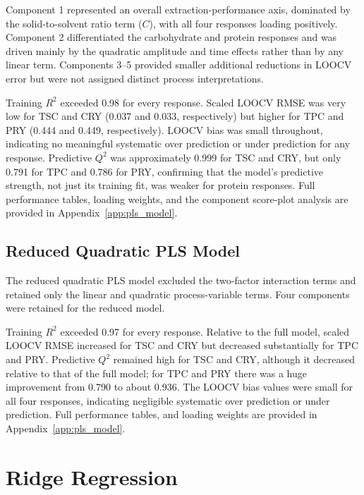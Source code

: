 \documentclass[MScDSA]{uccthesis}
\begin{document}
Component 1 represented an overall extraction-performance axis, dominated by the solid-to-solvent ratio term ($C$), with all four responses loading positively. Component 2 differentiated the carbohydrate and protein responses and was driven mainly by the quadratic amplitude and time effects rather than by any linear term. Components 3--5 provided smaller additional reductions in LOOCV error but were not assigned distinct process interpretations.

Training $R^2$ exceeded 0.98 for every response. Scaled LOOCV RMSE was very low for TSC and CRY (0.037 and 0.033, respectively) but higher for TPC and PRY (0.444 and 0.449, respectively). LOOCV bias was small throughout, indicating no meaningful systematic over prediction or under prediction for any response. Predictive $Q^2$ was approximately 0.999 for TSC and CRY, but only 0.791 for TPC and 0.786 for PRY, confirming that the model's predictive strength, not just its training fit, was weaker for protein responses. Full performance tables, loading weights, and the component score-plot analysis are provided in Appendix~\ref{app:pls_model}.

\subsection{Reduced Quadratic PLS Model}
\label{sec:red_quad_pls}
The reduced quadratic PLS model excluded the two-factor interaction terms and retained only the linear and quadratic process-variable terms. Four components were retained for the reduced model.

Training $R^2$ exceeded 0.97 for every response. Relative to the full model, scaled LOOCV RMSE increased for TSC and CRY but decreased substantially for TPC and PRY. Predictive $Q^2$ remained high for TSC and CRY, although it decreased relative to that of the full model; for TPC and PRY there was a huge improvement from 0.790 to about 0.936. The LOOCV bias values were small for all four responses, indicating negligible systematic over prediction or under prediction. Full performance tables, and loading weights are provided in Appendix~\ref{app:pls_model}.

\section{Ridge Regression}
\label{sec:ridge_res}
\end{document}
